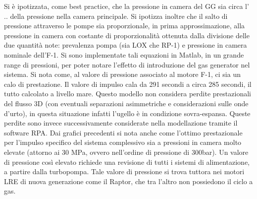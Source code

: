 Si è ipotizzata, come best practice, che la pressione in camera del GG sia circa l' .. della pressione nella camera principale. Si ipotizza inoltre che il salto di pressione attraverso le pompe sia proporzionale, in prima approssimazione, alla pressione in camera con costante di proporzionalità ottenuta dalla divisione delle due quantità note: prevalenza pompa (sia LOX che RP-1) e pressione in camera nominale dell'F-1. \cite{AIAA_book_1}
Si sono implementate tali equazioni in Matlab, in un grande range di pressioni, per poter notare l'effetto di introduzione del gas generator nel sistema. 
Si nota come, al valore di pressione associato al motore F-1, ci sia un calo di prestazione. Il valore di impulso cala da 291 secondi a circa 285 secondi, il tutto calcolato a livello mare. Questo modello non considera perdite prestazionali del flusso 3D (con eventuali separazioni asimmetriche e considerazioni sulle onde d'urto), in questa situazione infatti l'ugello è in condizione sovra-espansa. Queste perdite sono invece successivamente considerate nella modellazione tramite il software RPA. 
Dai grafici precedenti si nota anche come l'ottimo prestazionale per l'impulso specifico del sistema complessivo sia a pressioni in camera molto elevate (attorno ai 30 MPa, ovvero nell'ordine di pressione di 300bar). Un valore di pressione così elevato richiede una revisione di tutti i sistemi di alimentazione, a partire dalla turbopompa. Tale valore di pressione si trova tuttora nei motori LRE di nuova generazione come il Raptor, che tra l'altro non possiedono il ciclo a gas. 